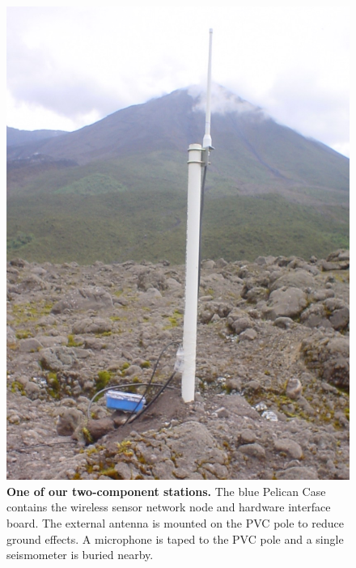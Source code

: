 \begin{figure}[t]
\begin{center}
\includegraphics[width=0.7\hsize]{./4-casestudy/figs/Node-212-5}
\end{center}
\caption{\textbf{One of our two-component stations.} The blue Pelican
Case contains the wireless sensor network node and hardware interface board.
The external antenna is mounted on the PVC pole to reduce ground effects.
A microphone is taped to the PVC pole and a single seismometer is buried
nearby.}
\label{includegraphics-fig-station2}
\end{figure}

